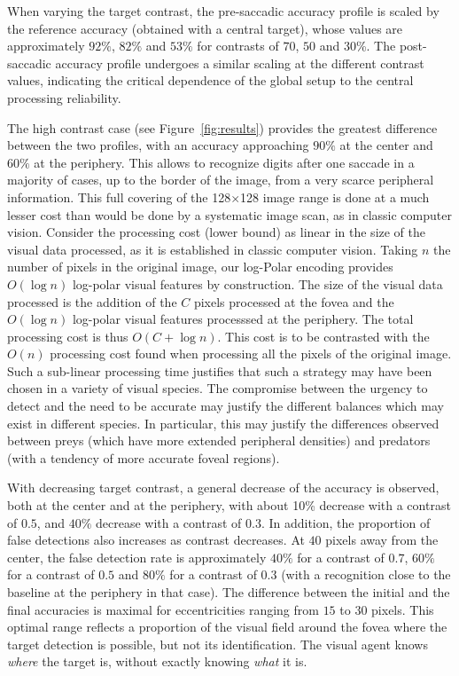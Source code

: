 When varying the target contrast, the pre-saccadic accuracy profile is scaled by the reference accuracy (obtained with a central target), whose values are approximately $92\%$, $82\%$ and $53\%$ for contrasts of $70$, $50$ and $30$\%. The post-saccadic accuracy profile undergoes a similar scaling at the different contrast values, indicating the critical dependence of the global setup to the central processing reliability.

The high contrast case (see Figure~\ref{fig:results}) provides the greatest difference between the two profiles, with an accuracy approaching $90\%$ at the center and $60\%$ at the periphery. This allows to recognize digits after one saccade in a majority of cases, up to the border of the image, from a very scarce peripheral information. This full covering of the 128$\times$128 image range is done at a much lesser cost than would be done by a systematic image scan, as in classic computer vision.
Consider the processing cost (lower bound) as linear in the size of the visual data processed, as it is established in classic computer vision. Taking $n$ the number of pixels in the original image, our log-Polar encoding provides $O(\log n)$ log-polar visual features by construction. The size of the visual data processed is the addition of the $C$ pixels processed at the fovea and the $O(\log n)$ log-polar visual features processsed at the periphery. The total processing cost is thus $O(C+\log n)$. This cost is to be contrasted with the $O(n)$ processing cost found when processing all the pixels of the original image. Such a sub-linear processing time justifies that such a strategy may have been chosen in a variety of visual species. The compromise between the urgency to detect and the need to be accurate may justify the different balances which may exist in different species. In particular, this may justify the differences observed between preys (which have more extended peripheral densities) and predators (with a tendency of more accurate foveal regions). %

With decreasing target contrast, a general decrease of the accuracy is observed, both at the center and at the periphery, with about 10\% decrease with a contrast of $0.5$, and $40\%$ decrease with a contrast of $0.3$. In addition, the proportion of false detections also increases as contrast decreases. At $40$ pixels away from the center, the false detection rate is approximately $40\%$ for a contrast of $0.7$, $60\%$ for a contrast of $0.5$ and $80\%$ for a contrast of $0.3$ (with a recognition close to the baseline at the periphery in that case). The difference between the initial and the final accuracies is maximal for eccentricities ranging from $15$ to $30$ pixels. This optimal range reflects a proportion of the visual field around the fovea where the target detection is possible, but not its identification. The visual agent knows \emph{where} the target is, without exactly knowing \emph{what} it is.
%
